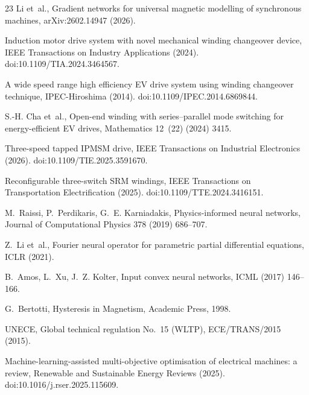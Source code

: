 \documentclass[review]{elsarticle}
\begin{document}
\begin{thebibliography}{23}
Li et~al., Gradient networks for universal magnetic modelling of synchronous
machines, arXiv:2602.14947 (2026).

Induction motor drive system with novel mechanical winding changeover
device, IEEE Transactions on Industry Applications (2024).
doi:10.1109/TIA.2024.3464567.

A wide speed range high efficiency EV drive system using winding changeover
technique, IPEC-Hiroshima (2014). doi:10.1109/IPEC.2014.6869844.

S.-H. Cha et~al., Open-end winding with series--parallel mode switching for
energy-efficient EV drives, Mathematics 12~(22) (2024) 3415.

Three-speed tapped IPMSM drive, IEEE Transactions on Industrial Electronics
(2026). doi:10.1109/TIE.2025.3591670.

Reconfigurable three-switch SRM windings, IEEE Transactions on
Transportation Electrification (2025). doi:10.1109/TTE.2024.3416151.

M.~Raissi, P.~Perdikaris, G.~E. Karniadakis, Physics-informed neural
networks, Journal of Computational Physics 378 (2019) 686--707.

Z.~Li et~al., Fourier neural operator for parametric partial differential
equations, ICLR (2021).

B.~Amos, L.~Xu, J.~Z. Kolter, Input convex neural networks, ICML (2017)
146--166.

G.~Bertotti, Hysteresis in Magnetism, Academic Press, 1998.

UNECE, Global technical regulation No.~15 (WLTP), ECE/TRANS/2015 (2015).

Machine-learning-assisted multi-objective optimisation of electrical
machines: a review, Renewable and Sustainable Energy Reviews (2025).
doi:10.1016/j.rser.2025.115609.

\end{thebibliography}
\end{document}
